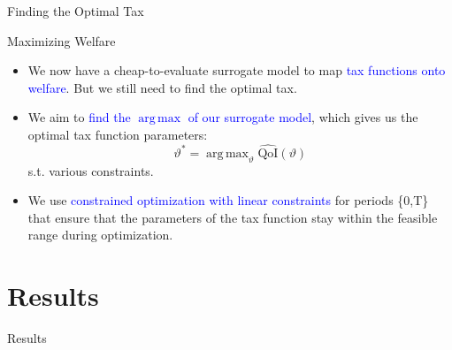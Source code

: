 \documentclass[aspectratio=1610]{beamer}
\DeclareMathOperator*{\argmax}{arg\,max}
\begin{document}
{
\begin{frame}
\Huge \textcolor{uzhblue}{Finding the Optimal Tax}
\end{frame}}

\begin{frame}{Maximizing Welfare}
\begin{itemize}
    \item We now have a cheap-to-evaluate surrogate model to map \textcolor{blue}{tax functions onto welfare}. But we still need to find the optimal tax. 
    \vspace{0.5cm}
    \item We aim to \textcolor{blue}{find the $\argmax$ of our surrogate model}, which gives us the optimal tax function parameters: 
    \[
       \vartheta^* = \argmax_{\vartheta} \widehat{\mathrm{QoI}}(\vartheta)
    \]
    s.t. various constraints. 
    \vspace{0.5cm}     
    \item We use \textcolor{blue}{constrained optimization with linear constraints} for periods \{0,T\} that ensure that the parameters of the tax function stay within the feasible range during optimization.
    \end{itemize}
\end{frame}

\section [Results]{ Results}

{
\begin{frame}
\Huge \textcolor{uzhblue}{ Results}
\end{frame}}
\end{document}
